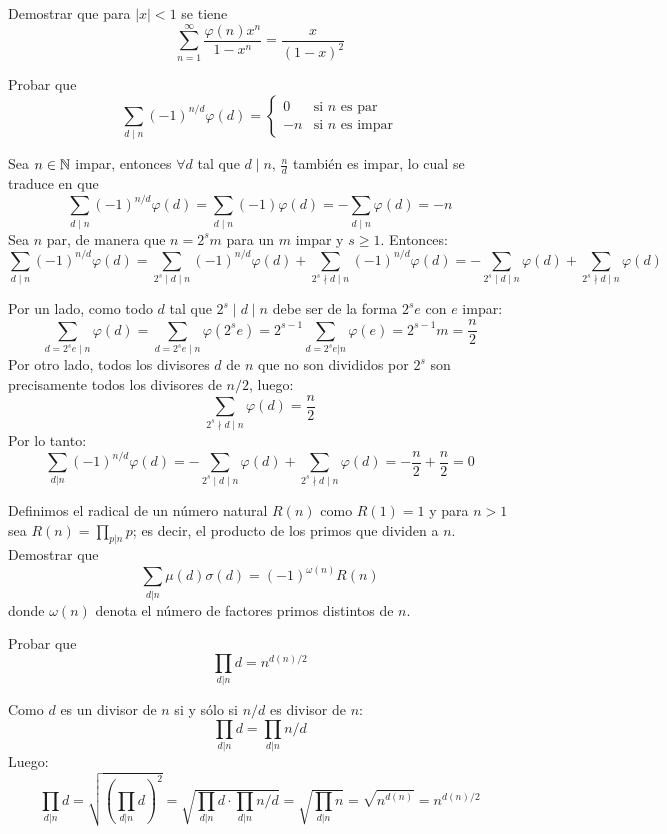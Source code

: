 \documentclass[twoside]{article}
\begin{document}
\newpage

\begin{ejercicio}{12}
Demostrar que para $|x| < 1$ se tiene
\[ \sum_{n=1}^{∞} \frac{φ(n) x^n}{1-x^n} = \frac{x}{(1-x)^2} \]
\end{ejercicio}
\begin{solucion}
\end{solucion}

\newpage

\begin{ejercicio}{13}
Probar que	
\[
\sum_{d\mid n} (-1)^{n/d}\varphi(d) = 
\begin{cases}
0 & \text{si $n$ es par}\\ 
-n & \text{si $n$ es impar}
\end{cases}
\]
\begin{sol}
Sea $n \in \mathbb{N}$ impar, entonces $\forall d$ tal que $d \mid n$, $\frac{n}{d}$ también es impar, lo cual se traduce en que
\[
\sum_{d\mid n} (-1)^{n/d}\varphi(d) = \sum_{d\mid n} (-1)\varphi(d) = -\sum_{d\mid n}\varphi(d) = -n
\]
Sea $n$ par, de manera que $n=2^sm$ para un $m$ impar y $s ≥ 1$. Entonces:
\[ \sum_{d\mid n}(-1)^{n/d}φ(d) =  \sum_{2^s\mid d \mid n}(-1)^{n/d}φ(d) +  \sum_{2^s\nmid d \mid n}(-1)^{n/d}φ(d) = -\sum_{2^s\mid d \mid n}φ(d) + \sum_{2^s\nmid d \mid n}φ(d) \]

Por un lado, como todo $d$ tal que $2^s\mid d \mid n$ debe ser de la forma $2^se$ con $e$ impar:
\[ \sum_{d=2^se \mid n} φ(d) = \sum_{d=2^se \mid n} φ(2^se) = 2^{s-1}\sum_{d=2^se|n} φ(e) = 2^{s-1}m = \frac{n}{2}\]
Por otro lado, todos los divisores $d$ de $n$ que no son divididos por $2^s$ son precisamente todos los divisores de $n/2$, luego:
\[ \sum_{2^s\nmid d \mid n}φ(d) = \frac{n}{2} \]
Por lo tanto:
\[ \sum_{d|n} (-1)^{n/d}φ(d) = -\sum_{2^s\mid d\mid n}φ(d)+\sum_{2^s\nmid d\mid n}φ(d) = -\frac{n}{2}+\frac{n}{2}=0\]
\end{sol}

\newpage

\begin{ejercicio}{14}
Definimos el radical de un número natural $R(n)$ como $R(1) = 1$ y para $n > 1$ sea $R(n) = \prod_{p|n} p$; es decir, el producto de los primos que dividen a $n$. Demostrar que
\[ \sum_{d|n} μ(d) σ(d) = (-1)^{ω(n)} R(n) \]
donde $ω(n)$ denota el número de factores primos distintos de $n$.
\end{ejercicio}
\begin{solucion}
\end{solucion}

\newpage

\begin{ejercicio}{15}
Probar que
\[ \prod_{d|n} d = n^{d(n)/2} \]
\end{ejercicio}

\begin{sol}
Como $d$ es un divisor de $n$ si y sólo si $n/d$ es divisor de $n$:
\[ \prod_{d|n} d = \prod_{d|n} n/d \]
Luego:
\[ \prod_{d|n} d = \sqrt{\left(\prod_{d|n} d\right)^2} = \sqrt{\prod_{d|n} d \cdot \prod_{d|n} n/d} = \sqrt{\prod_{d|n} n} = \sqrt{n^{d(n)}} = n^{d(n)/2} \]
\end{sol}
\end{ejercicio}
\end{document}
